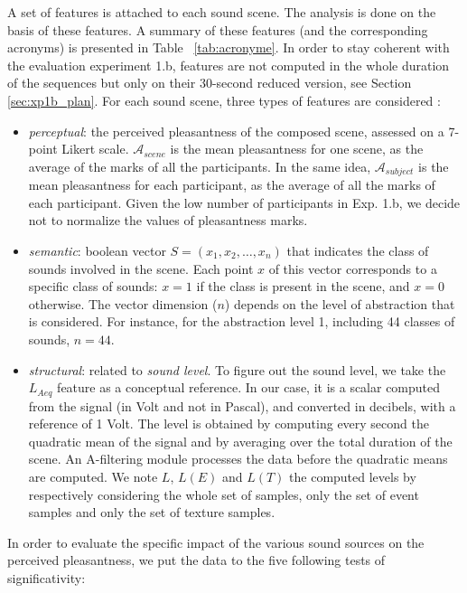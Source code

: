 \documentclass[twoside,twocolumn]{article}
\begin{document}
A set of features is attached to each sound scene. The analysis is done on the basis of these features. A summary of these features (and the corresponding acronyms) is presented in Table ~\ref{tab:acronyme}. In order to stay coherent with the evaluation experiment 1.b, features are not computed in the whole duration of the sequences but only on their 30-second reduced version, see Section \ref{sec:xp1b_plan}.
For each sound scene, three types of features are considered :
\begin{itemize}
\item \emph{perceptual}: the perceived pleasantness of the composed scene, assessed on a 7-point Likert scale. $\mathcal{A}_{scene}$ is the mean pleasantness for one scene, as the average of the marks of all the participants. In the same idea, $\mathcal{A}_{subject}$ is the mean pleasantness for each participant, as the average of all the marks of each participant. Given the low number of participants in Exp. 1.b, we decide not to normalize the values of pleasantness marks.
\item \emph{semantic}: boolean vector $S = (x_1, x_2, \ldots, x_n)$ that indicates the class of sounds involved in the scene. Each point $x$ of this vector corresponds to a specific class of sounds: $x = 1$ if the class is present in the scene, and $x = 0$ otherwise. The vector dimension ($n$) depends on the level of abstraction that is considered. For instance, for the abstraction level 1, including 44 classes of sounds, $n = 44$.
\item \emph{structural}: related to \emph{sound level}. To figure out the sound level, we take the $L_{Aeq}$ feature as a conceptual reference. In our case, it is a scalar computed from the  signal (in Volt and not in Pascal), and converted in decibels, with a reference of 1 Volt. The level is obtained by computing every second the quadratic mean of the signal and by averaging over the total duration of the scene. An A-filtering module processes the data before the quadratic means are computed. We note $L$, $L(E)$ and $L(T)$ the computed levels by respectively considering the whole set of samples, only the set of event samples and only the set of texture samples.
\end{itemize}

In order to evaluate the specific impact of the various sound sources on the perceived pleasantness, we put the data to the five following tests of significativity:
\end{document}
